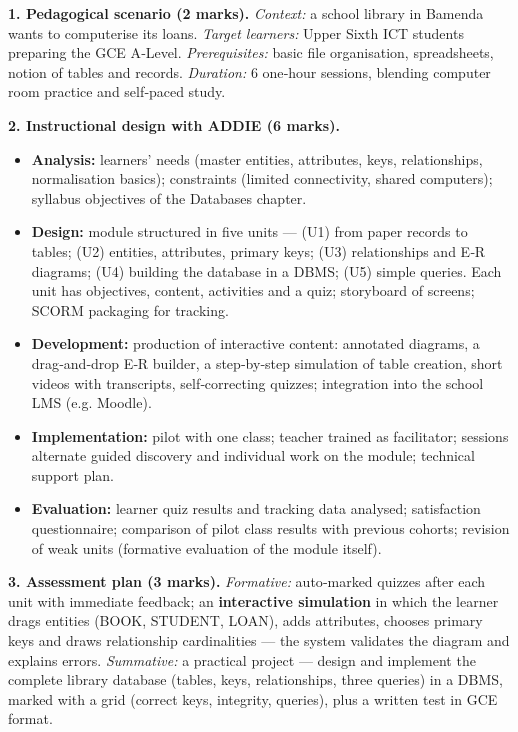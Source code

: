 \documentclass[11pt]{article}
\begin{document}
\begin{corrige}
\textbf{1. Pedagogical scenario (2 marks).}
\emph{Context:} a school library in Bamenda wants to computerise its loans. \emph{Target learners:} Upper Sixth ICT students preparing the GCE A‑Level. \emph{Prerequisites:} basic file organisation, spreadsheets, notion of tables and records. \emph{Duration:} 6 one‑hour sessions, blending computer room practice and self‑paced study.

\textbf{2. Instructional design with ADDIE (6 marks).}
\begin{itemize}
\item \textbf{Analysis:} learners' needs (master entities, attributes, keys, relationships, normalisation basics); constraints (limited connectivity, shared computers); syllabus objectives of the Databases chapter.
\item \textbf{Design:} module structured in five units — (U1) from paper records to tables; (U2) entities, attributes, primary keys; (U3) relationships and E‑R diagrams; (U4) building the database in a DBMS; (U5) simple queries. Each unit has objectives, content, activities and a quiz; storyboard of screens; SCORM packaging for tracking.
\item \textbf{Development:} production of interactive content: annotated diagrams, a drag‑and‑drop E‑R builder, a step‑by‑step simulation of table creation, short videos with transcripts, self‑correcting quizzes; integration into the school LMS (e.g. Moodle).
\item \textbf{Implementation:} pilot with one class; teacher trained as facilitator; sessions alternate guided discovery and individual work on the module; technical support plan.
\item \textbf{Evaluation:} learner quiz results and tracking data analysed; satisfaction questionnaire; comparison of pilot class results with previous cohorts; revision of weak units (formative evaluation of the module itself).
\end{itemize}

\textbf{3. Assessment plan (3 marks).}
\emph{Formative:} auto‑marked quizzes after each unit with immediate feedback; an \textbf{interactive simulation} in which the learner drags entities (BOOK, STUDENT, LOAN), adds attributes, chooses primary keys and draws relationship cardinalities — the system validates the diagram and explains errors. \emph{Summative:} a practical project — design and implement the complete library database (tables, keys, relationships, three queries) in a DBMS, marked with a grid (correct keys, integrity, queries), plus a written test in GCE format.


\end{corrige}
\end{document}
